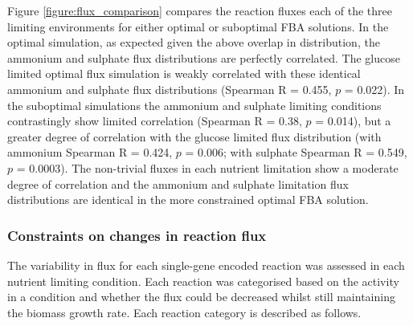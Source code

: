 Figure \vref{figure:flux_comparison} compares the reaction fluxes each of the three limiting environments for either optimal or suboptimal FBA solutions. In the optimal simulation, as expected given the above overlap in distribution, the ammonium and sulphate flux distributions are perfectly correlated. The glucose limited optimal flux simulation is weakly correlated with these identical ammonium and sulphate flux distributions (Spearman R = 0.455, $p$ = 0.022). In the suboptimal simulations the ammonium and sulphate limiting conditions contrastingly show limited correlation (Spearman R = 0.38, $p$ = 0.014), but a greater degree of correlation with the glucose limited flux distribution (with ammonium Spearman R = 0.424, $p$ = 0.006; with sulphate Spearman R = 0.549, $p$ = 0.0003). The non-trivial fluxes in each nutrient limitation show a moderate degree of correlation and the ammonium and sulphate limitation flux distributions are identical in the more constrained optimal FBA solution.

\subsubsection{Constraints on changes in reaction flux}%

The variability in flux for each single-gene encoded reaction was assessed in each nutrient limiting condition. Each reaction was categorised based on the activity in a condition and whether the flux could be decreased whilst still maintaining the biomass growth rate. Each reaction category is described as follows.

